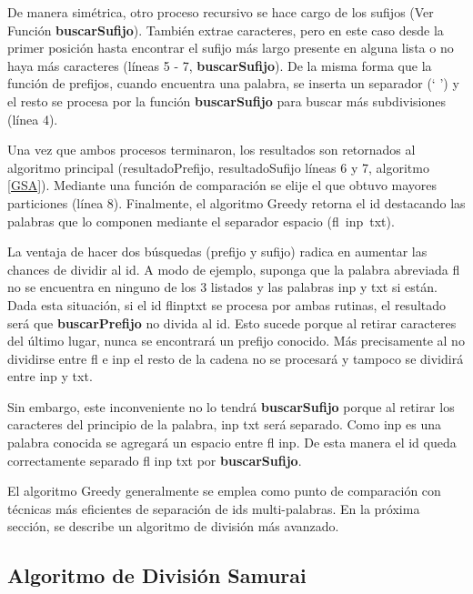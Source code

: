 De manera simétrica, otro proceso recursivo se hace cargo de los sufijos (Ver Función \textbf{buscarSufijo}). También extrae caracteres, pero en este caso desde la primer posición hasta encontrar el sufijo más largo presente en alguna lista o no haya más caracteres (líneas 5 - 7, \textbf{buscarSufijo}).
De la misma forma que la función de prefijos, cuando encuentra una palabra, se inserta un separador (` ') y el resto se procesa por la función \textbf{buscarSufijo} para buscar más subdivisiones (línea 4).



Una vez que ambos procesos terminaron, los resultados son retornados al algoritmo principal (\textsf{resultadoPrefijo, resultadoSufijo} líneas 6 y 7, algoritmo \ref{GSA}). Mediante una función de comparación se elije el que obtuvo mayores particiones (línea 8). Finalmente, el algoritmo Greedy retorna el id destacando las palabras que lo componen mediante el separador espacio \mbox{(\textsf{fl inp txt})}.

La ventaja de hacer dos búsquedas (prefijo y sufijo) radica en aumentar las chances de dividir al id. A modo de ejemplo, suponga que la palabra abreviada \textsf{fl}
no se encuentra en ninguno de los 3 listados y las palabras \textsf{inp} y \textsf{txt} si están. Dada esta situación, si el id \textsf{flinptxt} se procesa por ambas rutinas, el resultado será que \textbf{buscarPrefijo} no divida al id. Esto sucede porque al retirar caracteres del último lugar, nunca se encontrará un prefijo conocido. Más precisamente al no dividirse entre \textsf{fl} e \textsf{inp} el resto de la cadena no se procesará y tampoco se dividirá entre \textsf{inp} y \textsf{txt}. 

Sin embargo, este inconveniente no lo tendrá \textbf{buscarSufijo} porque al retirar los caracteres del principio de la palabra, \textsf{inp txt} será separado. Como \textsf{inp} es una palabra conocida se agregará un espacio entre \textsf{fl inp}. De esta manera el id queda correctamente separado \textsf{fl inp txt} por \textbf{buscarSufijo}.

El algoritmo Greedy generalmente se emplea como punto de comparación con técnicas más eficientes de separación de ids multi-palabras. En la próxima sección, se describe un algoritmo de división más avanzado.


\subsection{Algoritmo de División Samurai}
\label{sec:algSamu}

